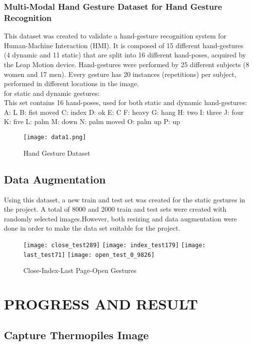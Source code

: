 \documentclass[thesis]{deutez}
\begin{document}
\subsection{Multi-Modal Hand Gesture Dataset for Hand Gesture Recognition}
This dataset was created to validate a hand-gesture recognition system for Human-Machine Interaction (HMI). It is composed of 15 different hand-gestures (4 dynamic and 11 static) that are split into 16 different hand-poses, acquired by the Leap Motion device. Hand-gestures were performed by 25 different subjects (8 women and 17 men). Every gesture has 20 instances (repetitions) per subject, performed in different locations in the image.\cite{dataset}\\
for static and dynamic gestures:\\
This set contains 16 hand-poses, used for both static and dynamic hand-gestures:\\
A: L
B: fist moved
C: index
D: ok
E: C
F: heavy
G: hang
H: two
I: three
J: four
K: five
L: palm
M: down
N: palm moved
O: palm up
P: up
\begin{figure}[h!]
	\centering
	\texttt{[image: data1.png]}
	\caption{Hand Gesture Dataset}
\end{figure}
\FloatBarrier
\section{Data Augmentation}
Using this dataset, a new train and test set was created for the static gestures in the project. A total of 8000 and 2000 train and test sets were created with randomly selected images.However, both resizing and data augmentation were done in order to make the data set suitable for the project.\cite{aug}

\begin{figure}[h!]
	\centering
	\texttt{[image: close\_test289]}
	\texttt{[image: index\_test179]}
	\texttt{[image: last\_test71]}
	\texttt{[image: open\_test\_0\_9826]}
	\caption{Close-Index-Last Page-Open Gestures}
\end{figure}
\FloatBarrier

\chapter{PROGRESS AND RESULT}
\section{Capture Thermopiles Image}
\end{document}
